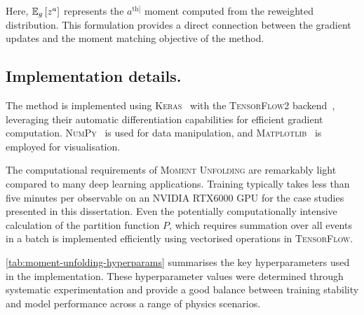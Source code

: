         Here, $\operatorname{\mathbb{E}}_g\qty[z^a]$ represents the $a^{\text{th}]}$ moment computed from the reweighted distribution.
        This formulation provides a direct connection between the gradient updates and the moment matching objective of the method.
        
    \subsection{Implementation details.}
        The method is implemented using \textsc{Keras}~\cite{chollet2015keras} with the \textsc{TensorFlow2} backend~\cite{Abadi2016TensorFlow:Learning}, leveraging their automatic differentiation capabilities for efficient gradient computation.
        \textsc{NumPy}~\cite{Harris2020ArrayNumPy} is used for data manipulation, and \textsc{Matplotlib}~\cite{Hunter2007Matplotlib:Environment} is employed for visualisation.

        The computational requirements of \textsc{Moment Unfolding} are remarkably light compared to many deep learning applications.
        Training typically takes less than five minutes per observable on an NVIDIA RTX6000 GPU for the case studies presented in this dissertation.
       Even the potentially computationally intensive calculation of the partition function $P$, which requires summation over all events in a batch is implemented efficiently using vectorised operations in \textsc{TensorFlow}.

        \cref{tab:moment-unfolding-hyperparams} summarises the key hyperparameters used in the implementation.
        These hyperparameter values were determined through systematic experimentation and provide a good balance between training stability and model performance across a range of physics scenarios.



